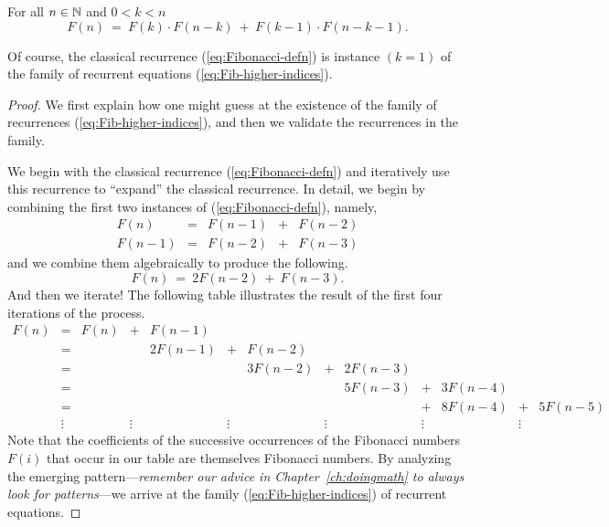 \begin{prop}
\label{thm:Fib-higher-indices}
For all $n \in \mathbb{N}$ and $0 < k < n$
\begin{equation}
\label{eq:Fib-higher-indices}
F(n) \ = \ F(k) \cdot F(n-k) \ + \ F(k-1) \cdot F(n-k-1).
\end{equation}
\end{prop}

Of course, the classical recurrence (\ref{eq:Fibonacci-defn}) is
instance $(k = 1)$ of the family of recurrent equations
(\ref{eq:Fib-higher-indices}).

\begin{proof}
We first explain how one might guess at the existence of the family of
recurrences (\ref{eq:Fib-higher-indices}), and then we validate the
recurrences in the family.

We begin with the classical recurrence (\ref{eq:Fibonacci-defn})
and iteratively use this recurrence to ``expand'' the classical
recurrence.  In detail, we begin by combining the first two instances
of (\ref{eq:Fibonacci-defn}), namely,
\[
\begin{array}{lcrrr}
F(n)   & = & F(n-1) & + & F(n-2) \\
F(n-1) & = & F(n-2) & + & F(n-3)
\end{array}
\]
and we combine them algebraically to produce the following.
\[ F(n) \ = \ 2 F(n-2) \ + \ F(n-3). \]
And then we iterate!  The following table illustrates the result of
the first four iterations of the process.
\[
\begin{array}{ccrcrcrcrcrcr}
F(n) & = & F(n) & + & F(n-1) \\
     & = &      &   & 2 F(n-1) & + & F(n-2) \\
     & = &      &   &          &   & 3 F(n-2) & + & 2 F(n-3) \\
     & = &      &   &          &   &          &   & 5 F(n-3) & + & 3 F(n-4)  \\
     & = &      &   &          &   &          &   &          & + & 8
F(n-4) & + & 5 F(n-5)  \\
 & \vdots  &  & \vdots  &  &  \vdots &  & \vdots
 &  & \vdots  &   & \vdots  & 
\end{array}
\]
Note that the coefficients of the successive occurrences of the
Fibonacci numbers $F(i)$ that occur in our table are themselves
Fibonacci numbers.  By analyzing the emerging pattern---{\em remember
  our advice in Chapter~\ref{ch:doingmath} to always look for
  patterns}---we arrive at the family (\ref{eq:Fib-higher-indices})
of recurrent equations.
\bigskip


\end{proof}
